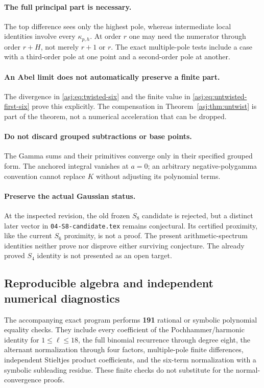 \paragraph{The full principal part is necessary.}
The top difference sees only the highest pole, whereas intermediate
local identities involve every $\kappa_{p,h}$. At order $r$ one may
need the numerator through order $r+H$, not merely $r+1$ or $r$.
The exact multiple-pole tests include a case with a third-order pole
at one point and a second-order pole at another.

\paragraph{An Abel limit does not automatically preserve a finite part.}
The divergence in \eqref{asj:eq:twisted-six} and the finite value in
\eqref{asj:eq:untwisted-first-six} prove this explicitly. The compensation
in Theorem~\ref{asj:thm:untwist} is part of the theorem, not a numerical
acceleration that can be dropped.

\paragraph{Do not discard grouped subtractions or base points.}
The Gamma sums and their primitives converge only in their specified
grouped form. The anchored integral vanishes at $a=0$; an arbitrary
negative-polygamma convention cannot replace $K$ without adjusting
its polynomial terms.

\paragraph{Preserve the actual Gaussian status.}
At the inspected revision, the old frozen $S_8$ candidate is rejected,
but a distinct later vector in \texttt{04-S8-candidate.tex} remains
conjectural. Its certified proximity, like the current $S_6$ proximity,
is not a proof. The present arithmetic-spectrum identities neither
prove nor disprove either surviving conjecture. The already proved
$S_4$ identity is not presented as an open target.

\subsection{Reproducible algebra and independent numerical diagnostics}
The accompanying exact program performs \textbf{191} rational or symbolic
polynomial equality checks. They include every coefficient of the
Pochhammer/harmonic identity for $1\le\ell\le18$, the full binomial
recurrence through degree eight, the alternant normalization through
four factors, multiple-pole finite differences, independent Stieltjes
product coefficients, and the six-term normalization with a symbolic
subleading residue. These finite checks do not substitute for the
normal-convergence proofs.

